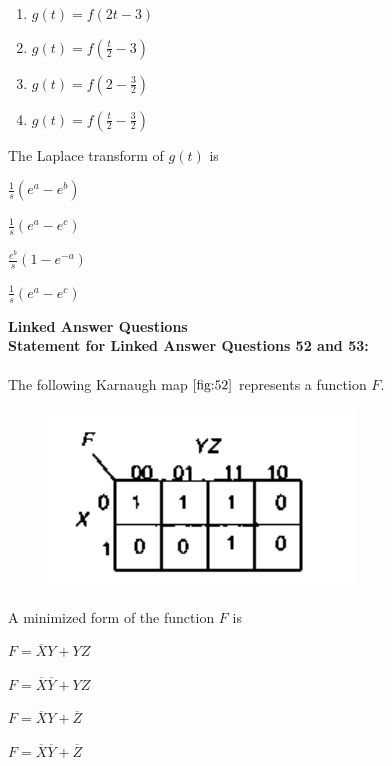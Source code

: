 \begin{multicols}{2}
\begin{enumerate}
    \item $g(t) = f(2t - 3)$
    \item $g(t) = f\left(\frac{t}{2} - 3\right)$
    \item $g(t) = f\left(2 - \frac{3}{2}\right)$
    \item $g(t) = f\left(\frac{t}{2} - \frac{3}{2}\right)$
\end{enumerate}
\end{multicols}
\item  The Laplace transform of $g(t)$ is
    \begin{enumerate}
    \begin{multicols}{2}
        \item $\frac{1}{s} \left(e^{a} - e^{b}\right)$
        \item $\frac{1}{s} \left(e^{a} - e^{c}\right)$
        \item $\frac{e^{b}}{s} \left(1 - e^{-a}\right)$
        \item $\frac{1}{s} \left(e^{a} - e^{c}\right)$
    \end{multicols}
    \end{enumerate}

\bigskip

\textbf{Linked Answer Questions}\\
\textbf{Statement for Linked Answer Questions 52 and 53:} \\\\
The following Karnaugh map $\ref{fig:52}$ represents a function $F$.
\begin{figure}[!ht]
    \centering
    \includegraphics[scale=0.4]{GATE-yearwise/GATE(3)/figs/52.png}
    \caption{}
    \label{fig:52}
\end{figure}
\item  A minimized form of the function $F$ is
    \begin{enumerate}
    \begin{multicols}{2}
        \item $F = \overline{X}Y + YZ$
        \item $F = \overline{X}\overline{Y} + YZ$
        \item $F = \overline{X}Y + \overline{Z}$
        \item $F = \overline{X}\overline{Y} + \overline{Z}$
    \end{multicols}
    \end{enumerate}
